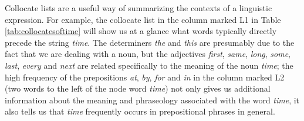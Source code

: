 Collocate lists are a useful way of summarizing the contexts of a linguistic expression. For example, the collocate list in the column marked L1 in Table \ref{tab:collocatesoftime} will show us at a glance what words typically directly precede the string \textit{time}. The determiners \textit{the} and \textit{this} are presumably due to the fact that we are dealing with a noun, but the adjectives \textit{first}, \textit{same}, \textit{long}, \textit{some}, \textit{last}, \textit{every} and \textit{next} are related specifically to the meaning of the noun \textit{time}; the high frequency of the prepositions \textit{at}, \textit{by}, \textit{for} and \textit{in} in the column marked L2 (two words to the left of the node word \textit{time}) not only gives us additional information about the meaning and phraseology associated with the word \textit{time}, it also tells us that \textit{time} frequently occurs in prepositional phrases in general.


